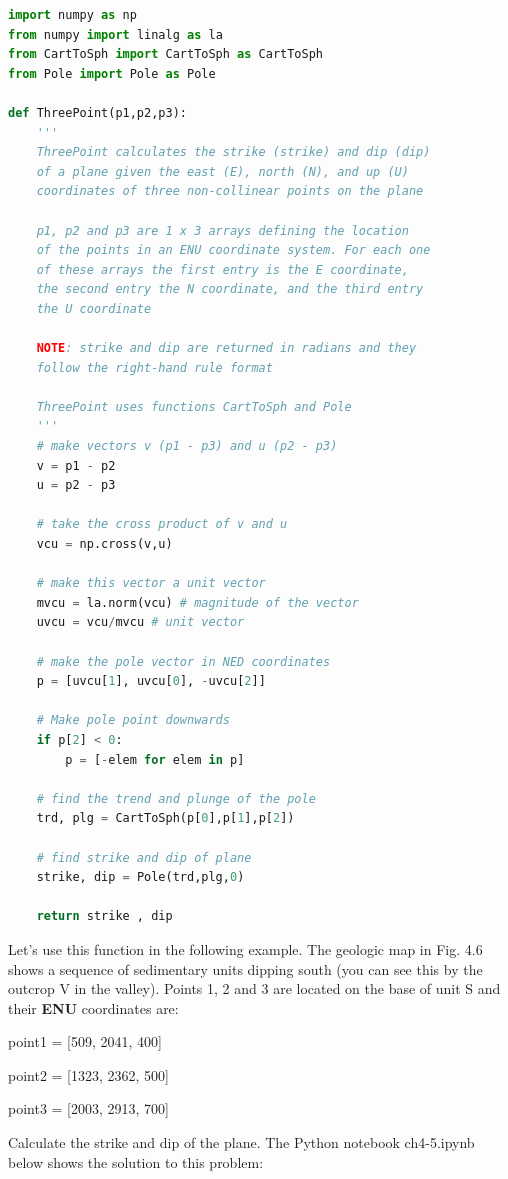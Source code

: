 \documentclass[a4paper , 12pt]{book}
\begin{document}
\begin{lstlisting}[language=Python, frame=single]
import numpy as np
from numpy import linalg as la
from CartToSph import CartToSph as CartToSph
from Pole import Pole as Pole

def ThreePoint(p1,p2,p3):
    '''
    ThreePoint calculates the strike (strike) and dip (dip) 
    of a plane given the east (E), north (N), and up (U) 
    coordinates of three non-collinear points on the plane
    
    p1, p2 and p3 are 1 x 3 arrays defining the location 
    of the points in an ENU coordinate system. For each one 
    of these arrays the first entry is the E coordinate, 
    the second entry the N coordinate, and the third entry 
    the U coordinate

    NOTE: strike and dip are returned in radians and they 
    follow the right-hand rule format

    ThreePoint uses functions CartToSph and Pole
    '''
    # make vectors v (p1 - p3) and u (p2 - p3)
    v = p1 - p2
    u = p2 - p3
    
    # take the cross product of v and u
    vcu = np.cross(v,u)
    
    # make this vector a unit vector
    mvcu = la.norm(vcu) # magnitude of the vector
    uvcu = vcu/mvcu # unit vector
    
    # make the pole vector in NED coordinates
    p = [uvcu[1], uvcu[0], -uvcu[2]]

    # Make pole point downwards
    if p[2] < 0:
        p = [-elem for elem in p]
        
    # find the trend and plunge of the pole
    trd, plg = CartToSph(p[0],p[1],p[2])
    
    # find strike and dip of plane
    strike, dip = Pole(trd,plg,0)
    
    return strike , dip
\end{lstlisting}

Let's use this function in the following example. The geologic map in Fig. 4.6 shows a sequence of sedimentary units dipping south (you can see this by the outcrop V in the valley). Points 1, 2 and 3 are located on the base of unit S and their \textbf{ENU} coordinates are: 

point1 = [509, 2041, 400]

point2 = [1323, 2362, 500]

point3 = [2003, 2913, 700] 

Calculate the strike and dip of the plane. The Python notebook ch4-5.ipynb below shows the solution to this problem:\\ 
\end{document}
